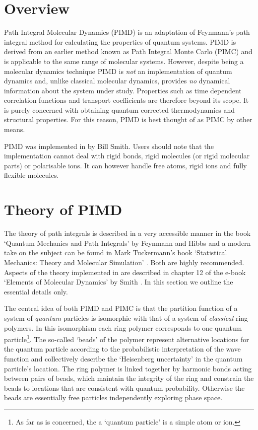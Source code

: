 \section{Overview}

Path Integral Molecular Dynamics (PIMD) is an adaptation of Feynmann's
path integral method \cite{feynmann-65} for calculating the properties
of quantum systems. PIMD is derived from an earlier method known as
Path Integral Monte Carlo (PIMC) and is applicable to the same range
of molecular systems. However, despite being a molecular dynamics
technique PIMD is {\em not} an implementation of quantum dynamics and,
unlike classical molecular dynamics, provides {\em no} dynamical
information about the system under study. Properties such as time
dependent correlation functions and transport coefficients are
therefore beyond its scope.  It is purely concerned with obtaining
quantum corrected thermodynamics and structural properties. For this
reason, PIMD is best thought of as PIMC by other means.

PIMD was implemented in \D{} by Bill Smith. Users should note that the
implementation cannot deal with rigid bonds, rigid molecules (or rigid
molecular parts) or polarisable ions. It can however handle free atoms,
rigid ions and fully flexible molecules.

\section{Theory of PIMD}
\label{pimdtheory}

The theory of path integrals is described in a very accessible manner
in the book `Quantum Mechanics and Path Integrals' by Feynmann and
Hibbs \cite{feynmann-65} and a modern take on the subject can be found
in Mark Tuckermann's book `Statistical Mechanics: Theory and Molecular
Simulation' \cite{tuckerman-10}. Both are highly recommended. Aspects
of the theory implemented in \DD{} are described in chapter 12 of the
e-book `Elements of Molecular Dynamics' by Smith \cite{smith-14}. In
this section we outline the essential details only.

The central idea of both PIMD and PIMC is that the partition function
of a system of {\em quantum} particles is isomorphic with that of a
system of {\em classical} ring polymers. In this isomorphism each ring
polymer corresponds to one quantum particle\footnote{As far as \DD{}
  is concerned, the a `quantum particle' is a simple atom or
  ion.}. The so-called `beads' of the polymer represent alternative
locations for the quantum particle according to the probabilistic
interpretation of the wave function and collectively describe the
`Heisenberg uncertainty' in the quantum particle's location. The ring
polymer is linked together by harmonic bonds acting between pairs of
beads, which maintain the integrity of the ring and constrain the
beads to locations that are consistent with quantum
probability. Otherwise the beads are essentially free particles
independently exploring phase space.


